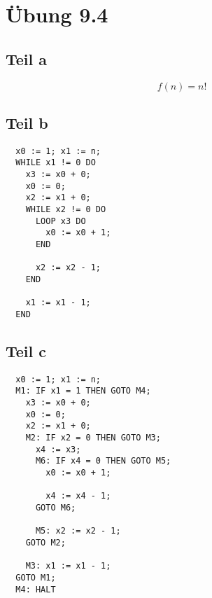 \documentclass[10pt,a4paper]{article}
\begin{document}
\section{Übung 9.4}

\subsection{Teil a}

\begin{equation}
  f(n) = n!
\end{equation}

\subsection{Teil b}

\begin{lstlisting}
  x0 := 1; x1 := n;
  WHILE x1 != 0 DO
    x3 := x0 + 0;
    x0 := 0;
    x2 := x1 + 0;
    WHILE x2 != 0 DO
      LOOP x3 DO
        x0 := x0 + 1;
      END

      x2 := x2 - 1;
    END

    x1 := x1 - 1;
  END
\end{lstlisting}

\subsection{Teil c}

\begin{lstlisting}
  x0 := 1; x1 := n;
  M1: IF x1 = 1 THEN GOTO M4;
    x3 := x0 + 0;
    x0 := 0;
    x2 := x1 + 0;
    M2: IF x2 = 0 THEN GOTO M3;
      x4 := x3;
      M6: IF x4 = 0 THEN GOTO M5;
        x0 := x0 + 1;

        x4 := x4 - 1;
      GOTO M6;

      M5: x2 := x2 - 1;
    GOTO M2;

    M3: x1 := x1 - 1;
  GOTO M1;
  M4: HALT
\end{lstlisting}
\end{document}
